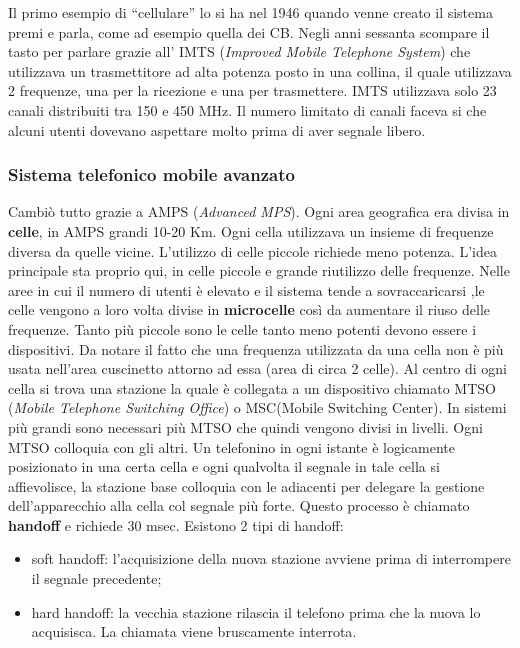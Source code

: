 Il primo esempio di ``cellulare'' lo si ha nel 1946 quando venne creato il sistema premi e parla, come ad esempio quella dei CB. Negli anni sessanta scompare il tasto per parlare grazie all' IMTS (\textit{Improved Mobile Telephone System}) che utilizzava un trasmettitore ad alta potenza posto in una collina, il quale utilizzava 2 frequenze, una per la ricezione e una per trasmettere. IMTS utilizzava solo 23 canali distribuiti tra 150 e 450 MHz. Il numero limitato di canali faceva si che alcuni utenti dovevano aspettare molto prima di aver segnale libero.

\subsubsection*{Sistema telefonico mobile avanzato}

Cambiò tutto grazie a AMPS (\textit{Advanced MPS}). Ogni area geografica era divisa in \textbf{celle}, in AMPS grandi 10-20 Km. Ogni cella utilizzava un insieme di frequenze diversa da quelle vicine. L'utilizzo di celle piccole richiede meno potenza. L'idea principale sta proprio qui, in celle piccole e grande riutilizzo delle frequenze. Nelle aree in cui il numero di utenti è elevato e il sistema tende a sovraccaricarsi ,le celle vengono a loro volta divise in \textbf{microcelle} così da aumentare il riuso delle frequenze. Tanto più piccole sono le celle tanto meno potenti devono essere i dispositivi. Da notare il fatto che una frequenza utilizzata da una cella non è più usata nell'area cuscinetto attorno ad essa (area di circa 2 celle). Al centro di ogni cella si trova una stazione la quale è collegata a un dispositivo chiamato MTSO (\textit{Mobile Telephone Switching Office}) o MSC(Mobile Switching Center). In sistemi più grandi sono necessari più MTSO che quindi vengono divisi in livelli. Ogni MTSO colloquia con gli altri. Un telefonino in ogni istante è logicamente posizionato in una certa cella e ogni qualvolta il segnale in tale cella si affievolisce, la stazione base colloquia con le adiacenti per delegare la gestione dell'apparecchio alla cella col segnale più forte. Questo processo è chiamato \textbf{handoff} e richiede 30 msec. Esistono 2 tipi di handoff:

\begin{itemize}

\item{soft handoff: l'acquisizione della nuova stazione avviene prima di interrompere il segnale precedente};
\item{hard handoff: la vecchia stazione rilascia il telefono prima che la nuova lo acquisisca. La chiamata viene bruscamente interrota}.

\end{itemize}

